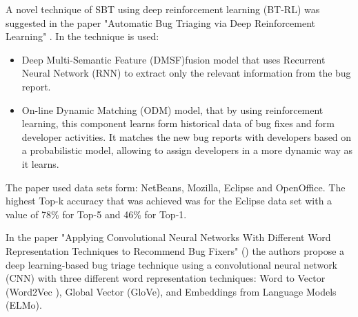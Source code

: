 	A novel technique of SBT using deep reinforcement learning (BT-RL) was suggested in the paper "Automatic Bug Triaging via Deep Reinforcement Learning" \cite{Liu2022}.
	In the technique is used:
	\begin{itemize}
		\item Deep Multi-Semantic Feature (DMSF)fusion model that uses Recurrent Neural Network (RNN) to extract only the relevant information from the bug report.
		\item On-line Dynamic Matching (ODM) model, that by using reinforcement learning, this component learns form historical data of bug fixes and form developer activities. It matches the new bug reports with developers based on a probabilistic model, allowing to assign developers in a more dynamic way as it learns.
	\end{itemize}
	The paper used data sets form: NetBeans, Mozilla, Eclipse and OpenOffice. The highest Top-k accuracy that was achieved was for the Eclipse data set with a value of 78\% for Top-5 and 46\% for Top-1.

	
	In the paper "Applying Convolutional Neural Networks With Different Word Representation Techniques to Recommend Bug Fixers" () the authors propose a deep learning-based bug triage technique using a convolutional neural network (CNN) with three different word representation techniques: Word to Vector (Word2Vec ), Global Vector (GloVe), and Embeddings from Language Models (ELMo). 



